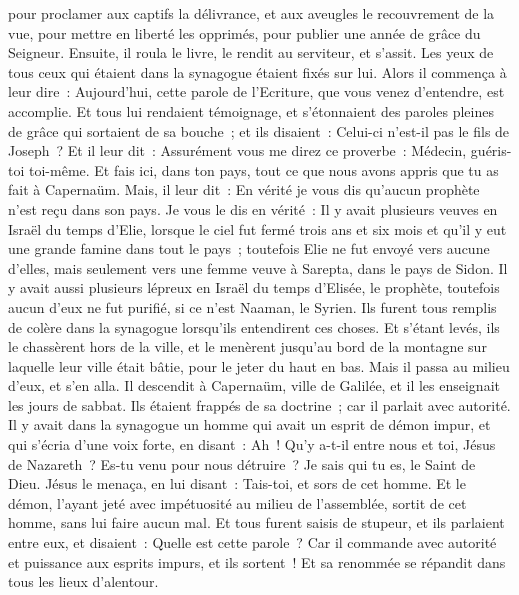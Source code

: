 \begin{multicols}{2}
pour proclamer aux captifs la délivrance, et aux aveugles le recouvrement de la vue, pour mettre en liberté les opprimés, pour publier une année de grâce du Seigneur.
Ensuite, il roula le livre, le rendit au serviteur, et s'assit. Les yeux de tous ceux qui étaient dans la synagogue étaient fixés sur lui.
Alors il commença à leur dire~: Aujourd'hui, cette parole de l'Ecriture, que vous venez d'entendre, est accomplie.
Et tous lui rendaient témoignage, et s'étonnaient des paroles pleines de grâce qui sortaient de sa bouche~; et ils disaient~: Celui-ci n'est-il pas le fils de Joseph~?
Et il leur dit~: Assurément vous me direz ce proverbe~: Médecin, guéris-toi toi-même. Et fais ici, dans ton pays, tout ce que nous avons appris que tu as fait à Capernaüm.
Mais, il leur dit~: En vérité je vous dis qu'aucun prophète n'est reçu dans son pays.
Je vous le dis en vérité~: Il y avait plusieurs veuves en Israël du temps d'Elie, lorsque le ciel fut fermé trois ans et six mois et qu'il y eut une grande famine dans tout le pays~;
toutefois Elie ne fut envoyé vers aucune d'elles, mais seulement vers une femme veuve à Sarepta, dans le pays de Sidon.
Il y avait aussi plusieurs lépreux en Israël du temps d'Elisée, le prophète, toutefois aucun d'eux ne fut purifié, si ce n'est Naaman, le Syrien.
Ils furent tous remplis de colère dans la synagogue lorsqu'ils entendirent ces choses.
Et s'étant levés, ils le chassèrent hors de la ville, et le menèrent jusqu'au bord de la montagne sur laquelle leur ville était bâtie, pour le jeter du haut en bas.
Mais il passa au milieu d'eux, et s'en alla.
Il descendit à Capernaüm, ville de Galilée, et il les enseignait les jours de sabbat.
Ils étaient frappés de sa doctrine~; car il parlait avec autorité.
Il y avait dans la synagogue un homme qui avait un esprit de démon impur, et qui s'écria d'une voix forte,
en disant~: Ah~! Qu'y a-t-il entre nous et toi, Jésus de Nazareth~? Es-tu venu pour nous détruire~? Je sais qui tu es, le Saint de Dieu.
Jésus le menaça, en lui disant~: Tais-toi, et sors de cet homme. Et le démon, l'ayant jeté avec impétuosité au milieu de l'assemblée, sortit de cet homme, sans lui faire aucun mal.
Et tous furent saisis de stupeur, et ils parlaient entre eux, et disaient~: Quelle est cette parole~? Car il commande avec autorité et puissance aux esprits impurs, et ils sortent~! 
Et sa renommée se répandit dans tous les lieux d'alentour.

\end{multicols}
